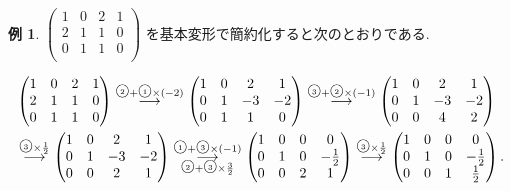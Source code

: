 \documentclass[dvipdfmx,a4paper,11pt]{article}
\newcommand{\maru}[1]{\raise0.2ex\hbox{\textcircled{\tiny{#1}}}}
\theoremstyle{definition}
\newtheorem{exa}[thm]{例}
\begin{document}
\begin{exa}
 \label{exa-kanyaku-2}
$
 \begin{pmatrix}
 1& 0& 2  &1\\
 2& 1& 1  &0\\
 0& 1& 1  &0\\
 \end{pmatrix}
 $
 を基本変形で簡約化すると次のとおりである.
 
 \begin{align*}
 &\begin{pmatrix}
 1& 0& 2  &1\\
 2& 1& 1  &0\\
 0& 1& 1  &0\\
 \end{pmatrix}
 \overset{\maru{2} + \maru{1}\times(-2)}{\longrightarrow} 
\begin{pmatrix}
 1& 0& 2  &1\\
 0& 1& -3 &-2\\
 0& 1& 1  &0\\
 \end{pmatrix}
\overset{\maru{3} + \maru{2}\times(-1)}{\longrightarrow} 
\begin{pmatrix}
 1& 0& 2  &1\\
 0& 1& -3 &-2\\
 0& 0& 4  &2\\
 \end{pmatrix}
 \\ %
 & \overset{\maru{3}\times \frac{1}{2}}{\longrightarrow} 
\begin{pmatrix}
 1& 0& 2  &1\\
 0& 1& -3 &-2\\
 0& 0& 2  &1\\
 \end{pmatrix} 
 \overset{\maru{1} + \maru{3}\times (-1)}{\underset{\maru{2} + \maru{3}\times \frac{3}{2}}{\longrightarrow}}
 \begin{pmatrix}
 1& 0& 0  &0\\
 0& 1& 0 &-\frac{1}{2}\\
 0& 0& 2  &1\\
 \end{pmatrix} 
 \overset{\maru{3}\times \frac{1}{2}}{\longrightarrow} 
  \begin{pmatrix}
 1& 0& 0  &0\\
 0& 1& 0 &-\frac{1}{2}\\
 0& 0& 1 &\frac{1}{2}\\
 \end{pmatrix}.
 \end{align*}
 \end{exa}
 
\end{document}
